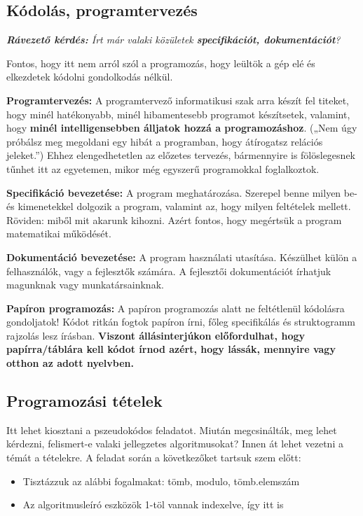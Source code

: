 \documentclass[../Main.tex]{subfiles}
\begin{document}
\subsection{Kódolás, programtervezés}

\textit{\textbf{Rávezető kérdés:}
Írt már valaki közületek \textbf{specifikációt, dokumentációt}?
}

Fontos, hogy itt nem arról szól a programozás, hogy leültök a gép elé és elkezdetek kódolni gondolkodás nélkül.


\textbf{Programtervezés:}
A programtervező informatikusi szak arra készít fel titeket, hogy minél hatékonyabb, minél hibamentesebb programot készítsetek, valamint, hogy \textbf{minél intelligensebben álljatok hozzá a programozáshoz}.
(„Nem úgy próbálsz meg megoldani egy hibát a programban, hogy átírogatsz relációs jeleket.”)
Ehhez elengedhetetlen az előzetes tervezés, bármennyire is fölöslegesnek tűnhet itt az egyetemen, mikor még egyszerű programokkal foglalkoztok.

\textbf{Specifikáció bevezetése:}
A program meghatározása.
Szerepel benne milyen be- és kimenetekkel dolgozik a program, valamint az, hogy milyen feltételek mellett.
Röviden: miből mit akarunk kihozni.
Azért fontos, hogy megértsük a program matematikai működését.

\textbf{Dokumentáció bevezetése:}
A program használati utasítása.
Készülhet külön a felhasználók, vagy a fejlesztők számára.
A fejlesztői dokumentációt írhatjuk magunknak vagy munkatársainknak.

\textbf{Papíron programozás:}
A papíron programozás alatt ne feltétlenül kódolásra gondoljatok!
Kódot ritkán fogtok papíron írni, főleg specifikálás és struktogramm rajzolás lesz írásban.
\textbf{Viszont állásinterjúkon előfordulhat, hogy papírra/táblára kell kódot írnod azért, hogy lássák, mennyire vagy otthon az adott nyelvben.}

\subsection{Programozási tételek}

Itt lehet kiosztani a pszeudokódos feladatot.
Miután megcsinálták, meg lehet kérdezni, felismert-e valaki jellegzetes algoritmusokat? Innen át lehet vezetni a témát a tételekre.
A feladat során a következőket tartsuk szem előtt:
\begin{itemize}
    \item Tisztázzuk az alábbi fogalmakat: tömb, modulo, tömb.elemszám
    \item Az algoritmusleíró eszközök 1-töl vannak indexelve, így itt is
\end{itemize}
\end{document}
